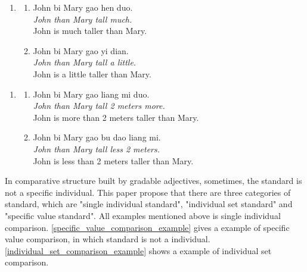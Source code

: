 \documentclass{ctexart}
\begin{document}
\begin{enumerate}[resume]
    \item
    \begin{enumerate}[ref=(\arabic{enumi}\alph*)]
        \item \label{dp_big_vague_example}
        John bi Mary gao hen duo.\\
        \textit{John than Mary tall much.} \\
        John is much taller than Mary.

        \item \label{dp_small_vague_example}
        John bi Mary gao yi dian.\\
        \textit{John than Mary tall a little.}\\
        John is a little taller than Mary.

    \end{enumerate}
\end{enumerate}

\begin{enumerate}[resume]
    \item
    \begin{enumerate}[ref=(\arabic{enumi}\alph*)]
        \item \label{dp_value_big_vague_example}
        John bi Mary gao liang mi duo.\\
        \textit{John than Mary tall 2 meters more.} \\
        John is more than 2 meters taller than Mary.

        \item \label{dp_value_small_vague_example}
        John bi Mary gao bu dao liang mi.\\
        \textit{John than Mary tall less 2 meters.} \\
        John is less than 2 meters taller than Mary.
    \end{enumerate}
\end{enumerate}

In comparative structure built by gradable adjectives, sometimes, the standard is not a specific individual. This paper propose that there are three categories of standard, which are "single individual standard", "individual set standard" and "specific value standard". All examples mentioned above is single individual comparison. \ref{specific_value_comparison_example} gives a example of specific value comparison, in which standard is not a individual. \ref{individual_set_comparison_example} shows a example of individual set comparison.
\end{document}
